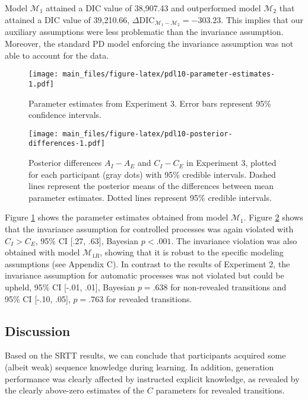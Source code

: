 \documentclass[floatsintext,doc]{apa6}
\theoremstyle{definition}
\theoremstyle{definition}
\theoremstyle{definition}
\theoremstyle{remark}
\begin{document}
Model \(\mathcal{M}_1\) attained a DIC value of 38,907.43 and
outperformed model \(\mathcal{M}_2\) that attained a DIC value of
39,210.66,
\(\Delta \textrm{DIC}_{\mathcal{M}_1 - \mathcal{M}_2} = -303.23\). This
implies that our auxiliary assumptions were less problematic than the
invariance assumption. Moreover, the standard PD model enforcing the
invariance assumption was not able to account for the data.

\begin{figure}
\centering
\texttt{[image: main\_files/figure-latex/pdl10-parameter-estimates-1.pdf]}
\caption{\label{fig:pdl10-parameter-estimates}Parameter estimates from
Experiment 3. Error bars represent 95\% confidence intervals.}
\end{figure}

\begin{figure}
\centering
\texttt{[image: main\_files/figure-latex/pdl10-posterior-differences-1.pdf]}
\caption{\label{fig:pdl10-posterior-differences}Posterior differences
\(A_I - A_E\) and \(C_I - C_E\) in Experiment 3, plotted for each
participant (gray dots) with 95\% credible intervals. Dashed lines
represent the posterior means of the differences between mean parameter
estimates. Dotted lines represent 95\% credible intervals.}
\end{figure}

Figure \ref{fig:pdl10-parameter-estimates} shows the parameter estimates
obtained from model \(\mathcal{M}_1\). Figure
\ref{fig:pdl10-posterior-differences} shows that the invariance
assumption for controlled processes was again violated with
\(C_I > C_E\), 95\% CI {[}.27, .63{]}, Bayesian \(p < .001\). The
invariance violation was also obtained with model \(\mathcal{M}_{1R}\),
showing that it is robust to the specific modeling assumptions (see
Appendix C). In contrast to the results of Experiment 2, the invariance
assumption for automatic processes was not violated but could be upheld,
95\% CI {[}-.01, .01{]}, Bayesian \(p = .638\) for non-revealed
transitions and 95\% CI {[}-.10, .05{]}, \(p = .763\) for revealed
transitions.

\subsection{Discussion}\label{discussion-2}

Based on the SRTT results, we can conclude that participants acquired
some (albeit weak) sequence knowledge during learning. In addition,
generation performance was clearly affected by instructed explicit
knowledge, as revealed by the clearly above-zero estimates of the \(C\)
parameters for revealed transitions.
\end{document}
